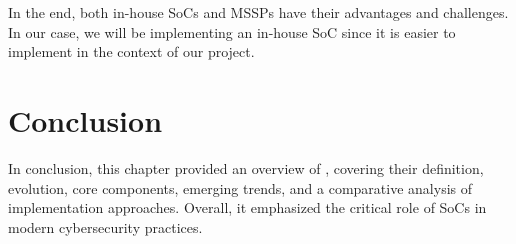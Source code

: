 In the end, both in-house SoCs and MSSPs have their advantages and challenges.
In our case, we will be implementing an in-house SoC since it is easier to implement in the context of our project.

\setcounter{secnumdepth}{0} %
\section{Conclusion}
In conclusion, this chapter provided an overview of , covering their definition, evolution, core components, emerging trends, and a comparative analysis of implementation approaches. Overall, it emphasized the critical role of SoCs in modern cybersecurity practices.
